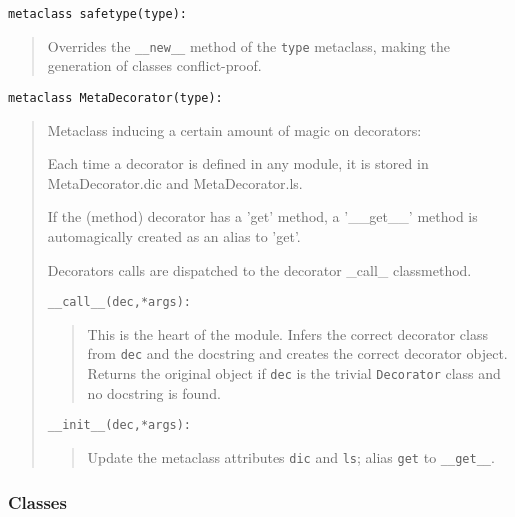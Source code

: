 \documentclass[11pt,english]{article}
\begin{document}
\texttt{metaclass safetype(type):}
\begin{quote}

Overrides the \texttt{{\_}{\_}new{\_}{\_}} method of the \texttt{type} metaclass, making the
generation of classes conflict-proof.
\end{quote}

\texttt{metaclass MetaDecorator(type):}
\begin{quote}

Metaclass inducing a certain amount of magic on decorators:
\begin{list}{.}
{
\setlength{\rightmargin}{\leftmargin}
}
\item 
Each time a decorator is defined in any module, it is stored in
MetaDecorator.dic and MetaDecorator.ls.

\item 
If the (method) decorator has a 'get' method, a '{\_}{\_}get{\_}{\_}' method
is automagically created as an alias to 'get'.

\item 
Decorators calls are dispatched to the decorator {\_}call{\_}
classmethod.

\end{list}

\texttt{{\_}{\_}call{\_}{\_}(dec,*args):}
\begin{quote}

This is the heart of the module. Infers the correct decorator class
from \texttt{dec} and the docstring and creates the correct decorator object.
Returns the original object if \texttt{dec} is the trivial \texttt{Decorator}
class and no docstring is found.
\end{quote}

\texttt{{\_}{\_}init{\_}{\_}(dec,*args):}
\begin{quote}

Update the metaclass attributes \texttt{dic} and \texttt{ls};
alias \texttt{get} to \texttt{{\_}{\_}get{\_}{\_}}.
\end{quote}
\end{quote}



\hypertarget{classes}{}
\subsubsection*{Classes}
\end{document}
